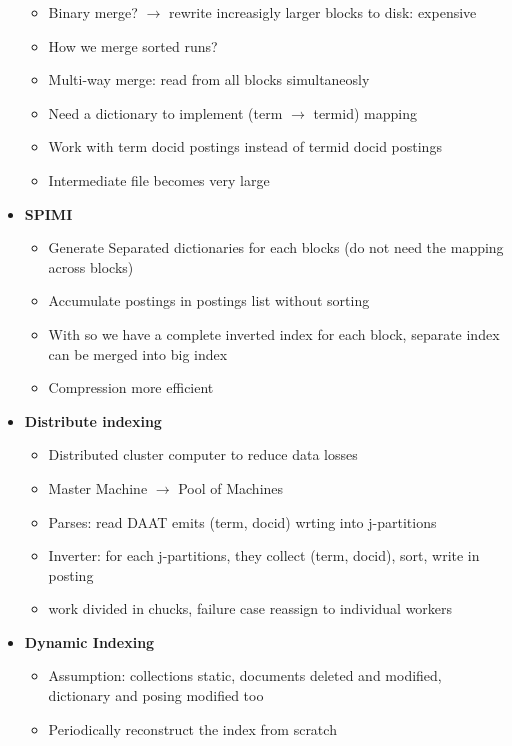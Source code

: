 \begin{itemize}
\begin{itemize}
\begin{itemize}
        \end{itemize}
        \item Binary merge? \(\rightarrow\) rewrite increasigly larger blocks to disk: expensive
        \item How we merge sorted runs?
        \item Multi-way merge: read from all blocks simultaneosly
        \item Need a dictionary to implement (term \(\rightarrow\) termid) mapping
        \item Work with term docid postings instead of termid docid postings
        \item Intermediate file becomes very large
    \end{itemize}
    \item \textbf{SPIMI}
    \begin{itemize}
        \item Generate Separated dictionaries for each blocks (do not need the mapping across blocks)
        \item Accumulate postings in postings list without sorting
        \item With so we have a complete inverted index for each block, separate index can be merged into big index
        \item Compression more efficient
    \end{itemize}
    \item \textbf{Distribute indexing}
    \begin{itemize}
        \item Distributed cluster computer to reduce data losses 
        \item Master Machine \(\rightarrow\) Pool of Machines
        \item Parses: read DAAT emits (term, docid) wrting into j-partitions 
        \item Inverter: for each j-partitions, they collect (term, docid), sort, write in posting
        \item work divided in chucks, failure case reassign to individual workers
    \end{itemize}
    \item \textbf{Dynamic Indexing}
    \begin{itemize}
        \item Assumption: collections static, documents deleted and modified, dictionary and posing modified too
        \item Periodically reconstruct the index from scratch

\end{itemize}
\end{itemize}
